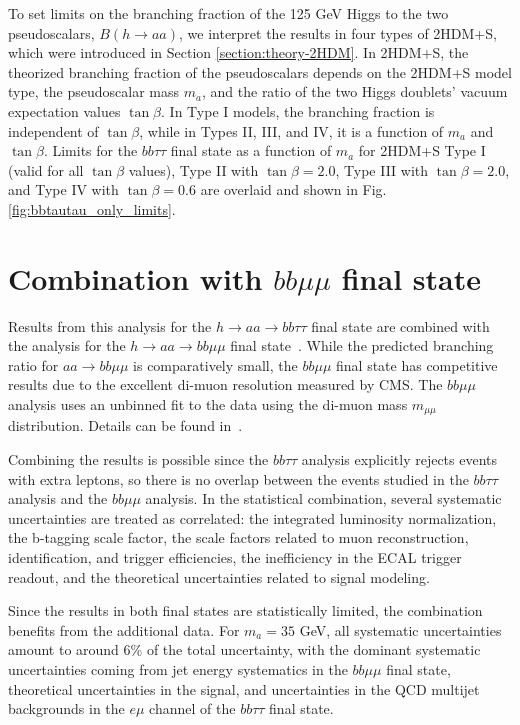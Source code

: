 To set limits on the branching fraction of the 125 GeV Higgs to the two pseudoscalars, $B(h \rightarrow aa)$, we interpret the results in four types of 2HDM+S, which were introduced in Section \ref{section:theory-2HDM}. In 2HDM+S, the theorized branching fraction of the pseudoscalars depends on the 2HDM+S model type, the pseudoscalar mass $m_a$, and the ratio of the two Higgs doublets' vacuum expectation values $\tan\beta$. In Type I models, the branching fraction is independent of $\tan\beta$, while in Types II, III, and IV, it is a function of $m_a$ and $\tan\beta$. Limits for the $bb\tau\tau$ final state as a function of $m_a$ for 2HDM+S Type I (valid for all $\tan\beta$ values), Type II with $\tan\beta = 2.0$, Type III with $\tan\beta = 2.0$, and Type IV with $\tan\beta = 0.6$ are overlaid and shown in Fig. \ref{fig:bbtautau_only_limits}.


\section{Combination with \texorpdfstring{$bb\mu\mu$}{bbmumu} final state}
\label{section:combination-procedure-with-bbmumu}
Results from this analysis for the $h \rightarrow aa \rightarrow bb\tau\tau$ final state are combined with the analysis for the $h \rightarrow aa \rightarrow bb\mu\mu$ final state~\cite{CMS-AN-21-058-bbmumu}. While the predicted branching ratio for $aa \rightarrow bb\mu\mu$ is comparatively small, the $bb\mu\mu$ final state has competitive results due to the excellent di-muon resolution measured by CMS. The $bb\mu\mu$ analysis uses an unbinned fit to the data using the di-muon mass $m_{\mu\mu}$ distribution. Details can be found in~\cite{CMS-AN-21-058-bbmumu}.

Combining the results is possible since the $bb\tau\tau$ analysis explicitly rejects events with extra leptons, so there is no overlap between the events studied in the $bb\tau\tau$ analysis and the $bb\mu\mu$ analysis. In the statistical combination, several systematic uncertainties are treated as correlated: the integrated luminosity normalization, the b-tagging scale factor, the scale factors related to muon reconstruction, identification, and trigger efficiencies, the inefficiency in the ECAL trigger readout, and the theoretical uncertainties related to signal modeling.

Since the results in both final states are statistically limited, the combination benefits from the additional data. For $m_a = 35$ GeV, all systematic uncertainties amount to around 6\% of the total uncertainty, with the dominant systematic uncertainties coming from jet energy systematics in the $bb\mu\mu$ final state, theoretical uncertainties in the signal, and uncertainties in the QCD multijet backgrounds in the $e\mu$ channel of the $bb\tau\tau$ final state.

